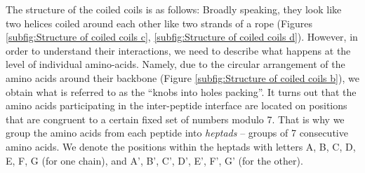 \documentclass[12pt,a4paper,titlepage,openany]{report}
\begin{document}
The structure of the coiled coils is as follows: Broadly speaking, they look like two helices coiled around each other like two strands of a rope (Figures \ref{subfig:Structure of coiled coils c}, \ref{subfig:Structure of coiled coils d}). However, in order to understand their interactions, we need to describe what happens at the level of individual amino-acids. Namely, due to the circular arrangement of the amino acids around their backbone (Figure \ref{subfig:Structure of coiled coils b}), we obtain what is referred to as the ``knobs into holes packing''. It turns out that the amino acids participating in the inter-peptide interface are located on positions that are congruent to a certain fixed set of numbers modulo 7. That is why we group the amino acids from each peptide into \emph{heptads} -- groups of 7 consecutive amino acids. We denote the positions within the heptads with letters A, B, C, D, E, F, G (for one chain), and A', B', C', D', E', F', G' (for the other).
\end{document}
